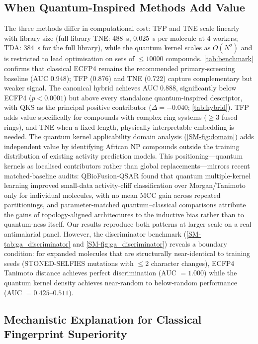 \documentclass[11pt,a4paper]{article}
\begin{document}
\subsection{When Quantum-Inspired Methods Add Value}

The three methods differ in computational cost: TFP and TNE scale linearly with library size (full-library TNE: \SI{488}{\second}, \SI{0.025}{\second} per molecule at 4 workers; TDA: \SI{384}{\second} for the full library), while the quantum kernel scales as $O(N^2)$ and is restricted to lead optimisation on sets of $\leq \num{10000}$ compounds. \cref{tab:benchmark} confirms that classical ECFP4 remains the recommended primary-screening baseline (AUC \num{0.948}); TFP (\num{0.876}) and TNE (\num{0.722}) capture complementary but weaker signal. The canonical hybrid achieves AUC \num{0.888}, significantly below ECFP4 ($p < \num{0.0001}$) but above every standalone quantum-inspired descriptor, with QKS as the principal positive contributor ($\Delta = -\num{0.040}$; \cref{tab:hybrid}). TFP adds value specifically for compounds with complex ring systems ($\geq 3$ fused rings), and TNE when a fixed-length, physically interpretable embedding is needed. The quantum kernel applicability domain analysis (\cref{SM-fig:domain}) adds independent value by identifying African NP compounds outside the training distribution of existing activity prediction models. This positioning---quantum kernels as localised contributors rather than global replacements---mirrors recent matched-baseline audits: QBioFusion-QSAR \citep{qbiofusion_2026} found that quantum multiple-kernel learning improved small-data activity-cliff classification over Morgan/Tanimoto only for individual molecules, with no mean MCC gain across repeated partitionings, and parameter-matched quantum--classical comparisons \citep{iso_qgnn_2026} attribute the gains of topology-aligned architectures to the inductive bias rather than to quantum-ness itself. Our results reproduce both patterns at larger scale on a real antimalarial panel. However, the discriminator benchmark (\cref{SM-tab:ga_discriminator} and \cref{SM-fig:ga_discriminator}) reveals a boundary condition: for expanded molecules that are structurally near-identical to training seeds (STONED-SELFIES mutations with $\leq 2$ character changes), ECFP4 Tanimoto distance achieves perfect discrimination (AUC $= \num{1.000}$) while the quantum kernel density achieves near-random to below-random performance (AUC $= \numrange{0.425}{0.511}$).

\subsection{Mechanistic Explanation for Classical Fingerprint Superiority}
\end{document}
